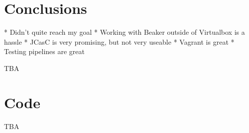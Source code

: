 \section{Conclusions}


* Didn't quite reach my goal
* Working with Beaker outside of Virtualbox is a hassle
* JCasC is very promising, but not very useable
* Vagrant is great
* Testing pipelines are great


TBA


\nocite{*}



\clearpage
\appendix

\section{Code}

TBA

%
%
%
%
%
%
%

